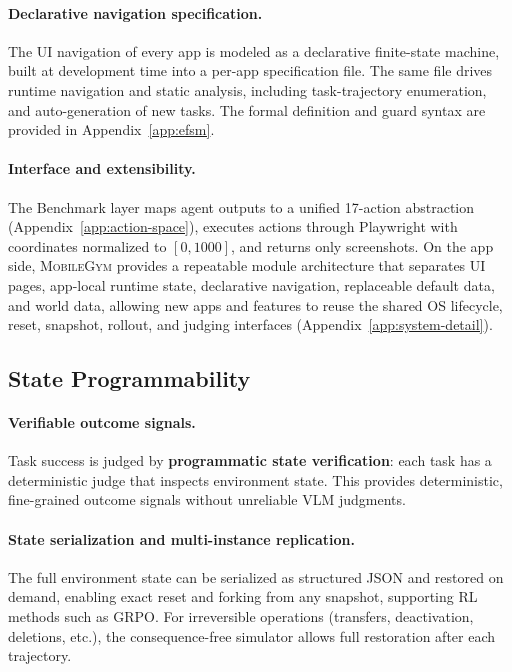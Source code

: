 \documentclass{llmxive}
\providecommand{\sys}{\textsc{MobileGym}}
\begin{document}
\paragraph{Declarative navigation specification.} The UI navigation of every app is modeled as a declarative finite-state machine, built at development time into a per-app specification file. The same file drives runtime navigation and static analysis, including task-trajectory enumeration, and auto-generation of new tasks. The formal definition and guard syntax are provided in Appendix~\ref{app:efsm}.

\paragraph{Interface and extensibility.} The Benchmark layer maps agent outputs to a unified 17-action abstraction (Appendix~\ref{app:action-space}), executes actions through Playwright with coordinates normalized to $[0,1000]$, and returns only screenshots. On the app side, \sys{} provides a repeatable module architecture that separates UI pages, app-local runtime state, declarative navigation, replaceable default data, and world data, allowing new apps and features to reuse the shared OS lifecycle, reset, snapshot, rollout, and judging interfaces (Appendix~\ref{app:system-detail}).

\subsection{State Programmability}\label{sec:system:state}

\paragraph{Verifiable outcome signals.} Task success is judged by \textbf{programmatic state verification}: each task has a deterministic judge that inspects environment state. This provides deterministic, fine-grained outcome signals without unreliable VLM judgments.

\paragraph{State serialization and multi-instance replication.} The full environment state can be serialized as structured JSON and restored on demand, enabling exact reset and forking from any snapshot, supporting RL methods such as GRPO. For irreversible operations (transfers, deactivation, deletions, etc.), the consequence-free simulator allows full restoration after each trajectory.
\end{document}
